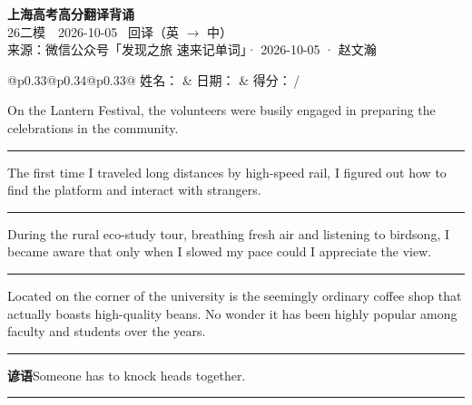 \documentclass[11pt,a4paper]{article}
\newcommand{\num}[1]{\makebox[1.9em][r]{#1.}\hspace{0.3em}}
\newcommand{\wline}{\noindent\rule{\linewidth}{0.4pt}}
\begin{document}
\pagestyle{plain}
\begin{center}
{\LARGE\bfseries 上海高考高分翻译背诵 }\\[0.25em]
{\large 26二模　2026-10-05 \quad\ 回译（英 $\to$ 中）}\\[0.35em]
{\footnotesize 来源：微信公众号「发现之旅 速来记单词」· 2026-10-05 · 赵文瀚}
\end{center}

\vspace{0.4em}
\noindent\begin{tabular}{@{}p{0.33\textwidth}@{}p{0.34\textwidth}@{}p{0.33\textwidth}@{}}
姓名：\underline{\hspace{2.0cm}} & 日期：\underline{\hspace{2.0cm}} & 得分：\underline{\hspace{1.4cm}}\,/ \\
\end{tabular}

\vspace{0.5em}

\vspace{0.8em}
\num{1}On the Lantern Festival, the volunteers were busily engaged in preparing the celebrations in the community.

\vspace{0.25em}

\wline

\num{2}The first time I traveled long distances by high-speed rail, I figured out how to find the platform and interact with strangers.

\vspace{0.25em}

\wline

\num{3}During the rural eco-study tour, breathing fresh air and listening to birdsong, I became aware that only when I slowed my pace could I appreciate the view.

\vspace{0.25em}

\wline

\num{4}Located on the corner of the university is the seemingly ordinary coffee shop that actually boasts high-quality beans. No wonder it has been highly popular among faculty and students over the years.

\vspace{0.25em}

\wline

\vspace{0.4em}\noindent{\color{rulegray}\rule{\textwidth}{0.6pt}}\vspace{0.4em}

\num{5}\textbf{谚语}\quad Someone has to knock heads together.

\vspace{0.25em}

\wline
\end{document}
